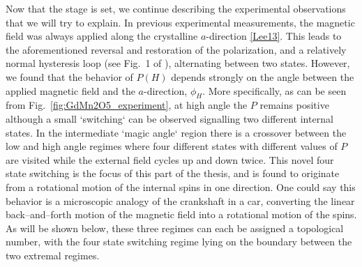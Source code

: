 Now that the stage is set, we continue describing the experimental observations that we will try to explain. In previous experimental measurements, the magnetic field was always applied along the crystalline $a$-direction \ref{Lee13}. This leads to the aforementioned reversal and restoration of the polarization, and a relatively normal hysteresis loop (see Fig.~1 of \cite{Lee13}), alternating between two states. However, we found that the behavior of $P(H)$ depends strongly on the angle between the applied magnetic field and the $a$-direction, $\phi_H$.
More specifically, as can be seen from Fig.~\ref{fig:GdMn2O5_experiment}, at high angle the $P$ remains positive although a small `switching` can be observed signalling two different internal states. In the intermediate `magic angle` region there is a crossover between the low and high angle regimes where four different states with different values of $P$ are visited while the external field cycles up and down twice.
This novel four state switching is the focus of this part of the thesis, and is found to originate from a rotational motion of the internal spins in one direction. One could say this behavior is a microscopic analogy of the crankshaft in a car, converting the linear back--and--forth motion of the magnetic field into a rotational motion of the spins.
As will be shown below, these three regimes can each be assigned a topological number, with the four state switching regime lying on the boundary between the two extremal regimes. 

\begin{figure}
	\caption{\label{fig:GdMn2O5_unit_cell}}
\end{figure}

